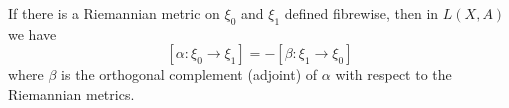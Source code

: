 If there is a Riemannian metric on $\xi_0$ and $\xi_1$ defined fibrewise, then in $L(X, A)$ we have
$$[\alpha: \xi_0 \rightarrow \xi_1] = -[\beta: \xi_1 \rightarrow \xi_0]$$
where $\beta$ is the orthogonal complement (adjoint) of $\alpha$ with respect to the Riemannian metrics.